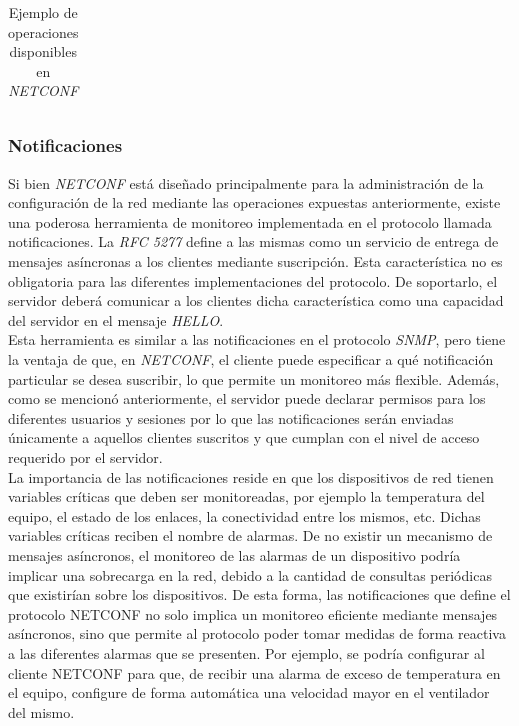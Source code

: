 \begin{table}[H]
\begin{tabular}{|c|c|c|}
	\end{tabular}
	\caption{Ejemplo de operaciones disponibles en \textit{NETCONF}}
	\label{Tab:netconf_operaciones}
	\end{table}


  \subsubsection{Notificaciones}

  Si bien \textit{NETCONF} está diseñado principalmente para la administración de la configuración de la red mediante las operaciones expuestas anteriormente, existe una poderosa herramienta de monitoreo implementada en el protocolo llamada notificaciones. La \textit{RFC 5277} define a las mismas como un servicio de entrega de mensajes asíncronas a los clientes mediante suscripción. Esta característica no es obligatoria para las diferentes implementaciones del protocolo. De soportarlo, el servidor deberá comunicar a los clientes dicha característica como una capacidad del servidor en el mensaje \textit{HELLO}.
  \\

  Esta herramienta es similar a las notificaciones en el protocolo \textit{SNMP}, pero tiene la ventaja de que, en \textit{NETCONF}, el cliente puede especificar a qué notificación particular se desea suscribir, lo que permite un monitoreo más flexible. Además, como se mencionó anteriormente, el servidor puede declarar permisos para los diferentes usuarios y sesiones por lo que las notificaciones serán enviadas únicamente a aquellos clientes suscritos y que cumplan con el nivel de acceso requerido por el servidor.
  \\

  La importancia de las notificaciones reside en que los dispositivos de red tienen variables críticas que deben ser monitoreadas, por ejemplo la temperatura del equipo, el estado de los enlaces, la conectividad entre los mismos, etc. Dichas variables críticas reciben el nombre de alarmas. De no existir un mecanismo de mensajes asíncronos, el monitoreo de las alarmas de un dispositivo podría implicar una sobrecarga en la red, debido a la cantidad de consultas periódicas que existirían sobre los dispositivos. 
De esta forma, las notificaciones que define el protocolo NETCONF no solo implica un monitoreo eficiente mediante mensajes asíncronos, sino que permite al protocolo poder tomar medidas de forma reactiva a las diferentes alarmas que se presenten. Por ejemplo, se podría configurar al cliente NETCONF para que, de recibir una alarma de exceso de temperatura en el equipo, configure de forma automática una velocidad mayor en el ventilador del mismo. 
  \\

